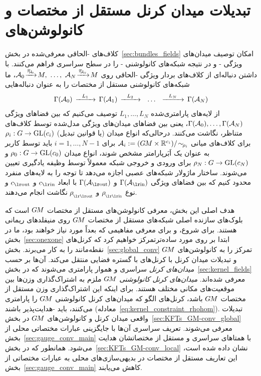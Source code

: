 

\section{تبدیلات میدان کرنل مستقل از مختصات و کانولوشن‌های }
\label{sec:gauge_CNNs_global}


کلاف‌های -الحاقی معرفی‌شده در بخش~\ref{sec:bundles_fields} امکان توصیف میدان‌های ویژگی - و در نتیجه شبکه‌های کانولوشنی - را در سطح سراسری فراهم می‌کنند.
با داشتن دنباله‌ای از کلاف‌های بردار ویژگی -الحاقی روی 
${\A_0\! \xrightarrow{\scalebox{.85}{$\pi_{{\scalebox{.65}{$\!\!\A_0$}}}$}}\! M ,}\ \dots,\ 
 {\A_N\! \xrightarrow{\scalebox{.85}{$\pi_{{\scalebox{.65}{$\!\!\A_N$}}}$}}\! M}$،
ما شبکه‌های کانولوشنی مستقل از مختصات را به عنوان دنباله‌هایی
\begin{align}
    \Gamma(\mathcal{A}_0)\, \xrightarrow{\ \ L_1\ \ }\, \Gamma(\mathcal{A}_1)\, \xrightarrow{\ \ L_2\ \ }\ \ \dots\ \ \xrightarrow{\ \ L_N\ \ }\, \Gamma(\mathcal{A}_N)
\end{align}
از لایه‌های پارامتری‌شده $L_1,\dots, L_N$ توصیف می‌کنیم که بین فضاهای ویژگی $\Gamma(\mathcal{A}_0), \dots, \Gamma(\mathcal{A}_N)$، یعنی بین فضاهای میدان‌های ویژگی مدل‌شده توسط کلاف‌های متناظر، نگاشت می‌کنند.
درحالی‌که انواع میدان (یا قوانین تبدیل) ${\rho_i:G\to\operatorname{GL}({c_i})}$ برای کلاف‌های میانی
$\mathcal{A}_i := (G\mkern-1.4muM\times\mathbb{R}^{c_i})/\!\sim_{\!\rho_i}$ برای $i=1,\dots,N-1$
باید توسط کاربر به عنوان یک اَبَرپارامتر مشخص شوند، انواع میدان $\rho_0:G\to\operatorname{GL}({c_0})$ و $\rho_N:G\to\operatorname{GL}({c_N})$ برای ورودی و خروجی شبکه معمولاً توسط وظیفه یادگیری تعیین می‌شوند.
ساختار ماژولار شبکه‌های عصبی اجازه می‌دهد تا توجه را به لایه‌های منفرد محدود کنیم که بین فضاهای ویژگی $\Gamma(\Ain)$ و $\Gamma(\Aout)$ با ابعاد $\cin$ و $\cout$ و نوع $\rhoin$ و $\rhoout$ نگاشت انجام می‌دهند.


\etocsettocstyle{}{} %
\localtableofcontents


هدف اصلی این بخش، معرفی کانولوشن‌های مستقل از مختصات $G\mkern-1.4muM$ است که بلوک‌های سازنده اصلی شبکه‌های مستقل از مختصات $G\mkern-1.4muM$ روی منیفلدهای ریمانی هستند.
برای شروع، و برای معرفی مفاهیمی که بعداً مورد نیاز خواهند بود، ما در بخش~\ref{sec:onexone} ابتدا بر روی مورد ساده‌تر\onexoneGMsitfarsi تمرکز خواهیم کرد که کرنل‌های نقطه‌مانند را به کار می‌برند.
بخش~\ref{sec:global_conv} تمرکز را به کانولوشن‌های $G\mkern-1.4muM$ و تبدیلات میدان کرنل با کرنل‌های با گستره فضایی منتقل می‌کند.
آن‌ها بر حسب \emph{میدان‌های کرنل} سراسری و هموار پارامتری می‌شوند که در بخش~\ref{sec:kernel_fields} معرفی شده‌اند.
\emph{میدان‌های کرنل کانولوشنی} $G\mkern-1.4muM$ ملزم به اشتراک‌گذاری وزن‌ها بین موقعیت‌های مکانی مختلف هستند.
برای اینکه این اشتراک‌گذاری وزن مستقل از مختصات $G\mkern-1.4muM$ باشد، کرنل‌های الگو که میدان‌های کرنل کانولوشنی $G\mkern-1.4muM$ را پارامتری می‌کنند، باید -هدایت‌پذیر باشند (معادله~\eqref{eq:kernel_constraint_rhohom}).
تبدیلات واقعی میدان کرنل و کانولوشن‌های $G\mkern-1.4muM$ در بخش~\ref{sec:KFTs_GM-conv_global} معرفی می‌شوند.
تعریف سراسری آن‌ها با جایگزینی عبارات مختصاتی محلی از بخش~\ref{sec:gauge_conv_main} با همتاهای سراسری و مستقل از مختصاتشان هدایت می‌شود.
همانطور که در بخش~\ref{sec:KFTs_GM-conv_local} نشان داده شده است، این تعاریف مستقل از مختصات در بدیهی‌سازی‌های محلی به عبارات مختصاتی از بخش~\ref{sec:gauge_conv_main} کاهش می‌یابند.